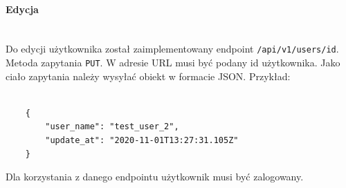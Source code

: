 % 
\paragraph{Edycja}\mbox{}\\

Do edycji użytkownika został zaimplementowany endpoint \texttt{/api/v1/users/{id}}.
Metoda zapytania \texttt{PUT}.
W adresie URL musi być podany id użytkownika.
Jako ciało zapytania należy wysyłać obiekt w formacie JSON. Przykład:
\begin{lstlisting}[basicstyle=\tiny\ttfamily]

    {
        "user_name": "test_user_2",
        "update_at": "2020-11-01T13:27:31.105Z"
    }
\end{lstlisting}
Dla korzystania z danego endpointu użytkownik musi być zalogowany.

